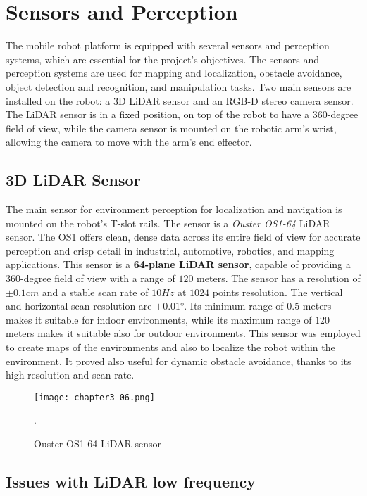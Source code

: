 \section{Sensors and Perception}

The mobile robot platform is equipped with several sensors and perception systems, which are essential for the project's
objectives. The sensors and perception systems are used for mapping and localization, obstacle avoidance, object detection
and recognition, and manipulation tasks. 
Two main sensors are installed on the robot: a 3D LiDAR sensor and an RGB-D stereo camera sensor.
The LiDAR sensor is in a fixed position, on top of the robot to have a 360-degree field of view, while the camera sensor
is mounted on the robotic arm's wrist, allowing the camera to move with the arm's end effector.

\subsection{3D LiDAR Sensor}

The main sensor for environment perception for localization and navigation is mounted on the robot's T-slot rails.
The sensor is a \textit{Ouster OS1-64} LiDAR sensor.
The OS1 offers clean, dense data across its entire field of view for accurate perception and crisp detail in industrial,
automotive, robotics, and mapping applications.
This sensor is a \textbf{64-plane LiDAR sensor}, capable of providing a 360-degree field of view with a range of $120$ meters. 
The sensor has a resolution of $\pm 0.1cm$ and a stable scan rate of $10 Hz$ at $1024$ points resolution.
The vertical and horizontal scan resolution are $\pm 0.01$°.
Its minimum range of $0.5$ meters makes it suitable for indoor environments, while its maximum range of $120$ meters
makes it suitable also for outdoor environments.
This sensor was employed to create maps of the environments and also to localize the robot within the environment.
It proved also useful for dynamic obstacle avoidance, thanks to its high resolution and scan rate.

\begin{figure}[t]
    \centering
    \texttt{[image: chapter3\_06.png]}
    \captionsetup{width=1\linewidth}
    \caption{Ouster OS1-64 LiDAR sensor}.
    \label{fig:c3_img06}
\end{figure}

\subsection{Issues with LiDAR low frequency}

